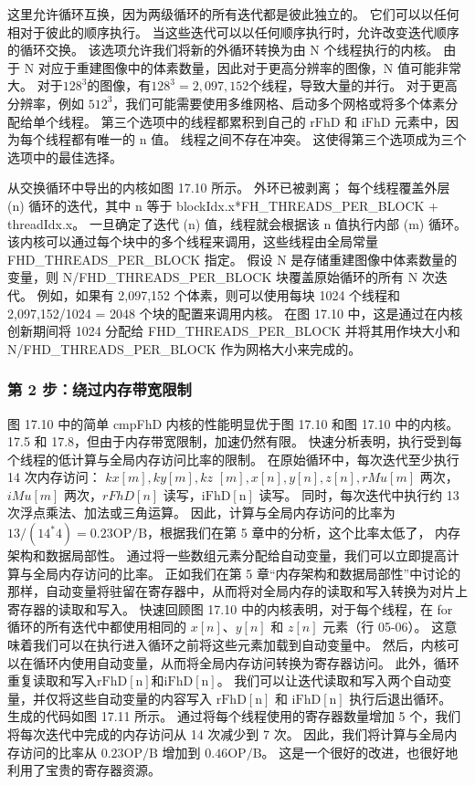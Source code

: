 这里允许循环互换，因为两级循环的所有迭代都是彼此独立的。 它们可以以任何相对于彼此的顺序执行。 当这些迭代可以以任何顺序执行时，允许改变迭代顺序的循环交换。 该选项允许我们将新的外循环转换为由 N 个线程执行的内核。 由于 N 对应于重建图像中的体素数量，因此对于更高分辨率的图像，$\mathrm{N}$ 值可能非常大。 对于$128^{3}$的图像，有$128^{3}=$$2,097,152$个线程，导致大量的并行。 对于更高分辨率，例如 $512^{3}$，我们可能需要使用多维网格、启动多个网格或将多个体素分配给单个线程。 第三个选项中的线程都累积到自己的 $\mathrm{rFhD}$ 和 $\mathrm{iFhD}$ 元素中，因为每个线程都有唯一的 $\mathrm{n}$ 值。 线程之间不存在冲突。 这使得第三个选项成为三个选项中的最佳选择。

从交换循环中导出的内核如图 17.10 所示。 外环已被剥离； 每个线程覆盖外层 (n) 循环的迭代，其中 $\mathrm{n}$ 等于 blockIdx.x*FH\_THREADS\_PER\_BLOCK + threadIdx.x。 一旦确定了迭代 (n) 值，线程就会根据该 $\mathrm{n}$ 值执行内部 (m) 循环。 该内核可以通过每个块中的多个线程来调用，这些线程由全局常量 FHD\_THREADS\_PER\_BLOCK 指定。 假设 $\mathrm{N}$ 是存储重建图像中体素数量的变量，则 N/FHD\_THREADS\_PER\_BLOCK 块覆盖原始循环的所有 N 次迭代。 例如，如果有 2,097,152 个体素，则可以使用每块 1024 个线程和 2,097,152/1024 = 2048 个块的配置来调用内核。 在图 17.10 中，这是通过在内核创新期间将 1024 分配给 FHD\_THREADS\_PER\_BLOCK 并将其用作块大小和 N/FHD\_THREADS\_PER\_BLOCK 作为网格大小来完成的。

\subsubsection{第 2 步：绕过内存带宽限制}
图 17.10 中的简单 cmpFhD 内核的性能明显优于图 17.10 和图 17.10 中的内核。 17.5 和 17.8，但由于内存带宽限制，加速仍然有限。 快速分析表明，执行受到每个线程的低计算与全局内存访问比率的限制。 在原始循环中，每次迭代至少执行 14 次内存访问： $k x[m], k y[m], k z$ $[m], x[n], y[n], z[n], r M u [m]$ 两次，$i M u[m]$ 两次，$r F h D[n]$ 读写，$\mathrm{iFhD}[\mathrm{n}]$ 读写。 同时，每次迭代中执行约 13 次浮点乘法、加法或三角运算。 因此，计算与全局内存访问的比率为 $13 /\left(14^{*} 4\right)=0.23 \mathrm{OP} / \mathrm{B}$，根据我们在第 5 章中的分析，这个比率太低了， 内存架构和数据局部性。 通过将一些数组元素分配给自动变量，我们可以立即提高计算与全局内存访问的比率。 正如我们在第 5 章“内存架构和数据局部性”中讨论的那样，自动变量将驻留在寄存器中，从而将对全局内存的读取和写入转换为对片上寄存器的读取和写入。 快速回顾图 17.10 中的内核表明，对于每个线程，在 for 循环的所有迭代中都使用相同的 $x[n]、y[n]$ 和 $z[n]$ 元素（行 05-06）。 这意味着我们可以在执行进入循环之前将这些元素加载到自动变量中。 然后，内核可以在循环内使用自动变量，从而将全局内存访问转换为寄存器访问。 此外，循环重复读取和写入$\mathrm{rFhD}[\mathrm{n}]$和$\mathrm{iFhD}[\mathrm{n}]$。 我们可以让迭代读取和写入两个自动变量，并仅将这些自动变量的内容写入 $\mathrm{rFhD}[\mathrm{n}]$ 和 $\mathrm{iFhD}[\mathrm{n} ]$ 执行后退出循环。 生成的代码如图 17.11 所示。 通过将每个线程使用的寄存器数量增加 5 个，我们将每次迭代中完成的内存访问从 14 次减少到 7 次。 因此，我们将计算与全局内存访问的比率从 $0.23 \mathrm{OP} / \mathrm{B}$ 增加到 $0.46 \mathrm{OP} / \mathrm{B}$。 这是一个很好的改进，也很好地利用了宝贵的寄存器资源。

